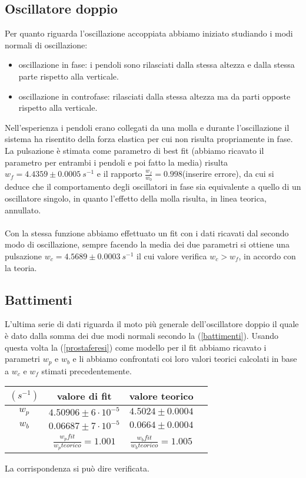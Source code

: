 \documentclass{article}
\begin{document}
	\subsection{Oscillatore doppio}
	 Per quanto riguarda l'oscillazione accoppiata abbiamo iniziato studiando i modi normali di oscillazione:\\
	 \begin{itemize}
	 	\item oscillazione in fase: i pendoli sono rilasciati dalla stessa altezza e dalla stessa parte rispetto alla verticale.
	 	\item oscillazione in controfase: rilasciati dalla stessa altezza ma da parti opposte rispetto alla verticale.
	 \end{itemize}
	Nell'esperienza i pendoli erano collegati da una molla e durante l'oscillazione il sistema ha risentito della forza elastica per cui non risulta propriamente in fase. La pulsazione \`{e} stimata come parametro di best fit (abbiamo ricavato il parametro per entrambi i pendoli e poi fatto la media) risulta $w_f = 4.4359  \pm 0.0005\ s^{-1}$ e il rapporto $\frac{w_f}{w_0} = 0.998$(inserire errore), da cui si deduce che il comportamento degli oscillatori in fase sia equivalente a quello di un oscillatore singolo, in quanto l'effetto della molla risulta, in linea teorica, annullato.\\\\
	Con la stessa funzione abbiamo effettuato un fit con i dati ricavati dal secondo modo di oscillazione, sempre facendo la media dei due parametri si ottiene una pulsazione $w_c = 4.5689 \pm 0.0003\ s^{-1}$ il cui valore verifica $w_c > w_f$, in accordo con la teoria.\\
	
	\subsection{Battimenti}
	L'ultima serie di dati riguarda il moto pi\`{u} generale dell'oscillatore doppio il quale \`{e} dato dalla somma dei due modi normali secondo la (\ref{battimenti}).
	Usando questa volta la (\ref{prostaferesi}) come modello per il fit abbiamo ricavato i parametri $w_p$ e $w_b$ e li abbiamo confrontati coi loro valori teorici calcolati in base a $w_c$ e $w_f$ stimati precedentemente.\\
	\begin{center}
	\begin{tabular}{cccc} 
		$(s^{-1})$ & valore di fit & valore teorico & \\ 
		\hline 
	    $w_p$ & $4.50906 \pm 6\cdot 10^{-5}$ & $4.5024 \pm 0.0004$\\
		\hline 
		$w_b$& $0.06687 \pm 7\cdot10^{-5}$ & $0.0664\pm 0.0004$\\ 
		\hline 
		\hline
		& $\frac{w_p fit}{w_p teorico}=1.001$ & $\frac{w_b fit}{w_b teorico}=1.005$\\ 
	\end{tabular}
	\end{center}
	La corrispondenza si pu\`{o} dire verificata.\\
	
\end{document}
